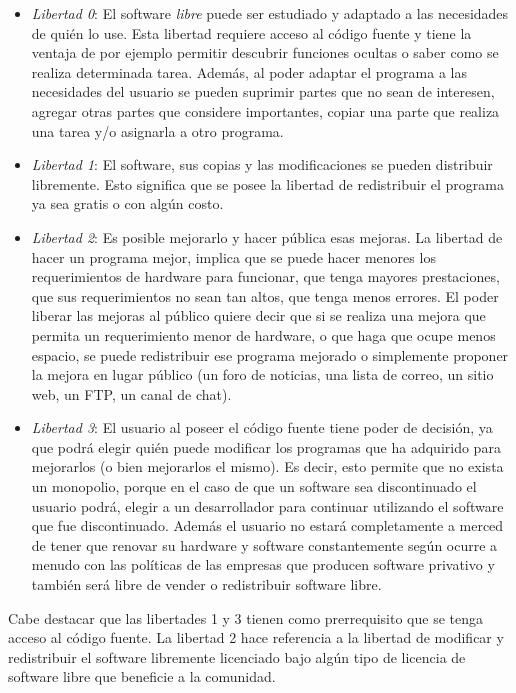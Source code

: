 \begin{itemize}
\item \textit{Libertad 0}: El software \textit{libre} puede ser
  estudiado y adaptado a las necesidades de quién lo use. Esta
  libertad requiere acceso al código fuente y tiene la ventaja de por
  ejemplo permitir descubrir funciones ocultas o saber como se realiza
  determinada tarea. Además, al poder adaptar el programa a las
  necesidades del usuario se pueden suprimir partes que no sean de
  interesen, agregar otras partes que considere importantes, copiar
  una parte que realiza una tarea y/o asignarla a otro programa.
\item \textit{Libertad 1}: El software, sus copias y las
  modificaciones se pueden distribuir libremente. Esto significa que
  se posee la libertad de redistribuir el programa ya sea gratis o con
  algún costo.
\item \textit{Libertad 2}: Es posible mejorarlo y hacer pública esas
  mejoras. La libertad de hacer un programa mejor, implica que se
  puede hacer menores los requerimientos de hardware para funcionar,
  que tenga mayores prestaciones, que sus requerimientos no sean tan
  altos, que tenga menos errores. El poder liberar las mejoras al
  público quiere decir que si se realiza una mejora que permita un
  requerimiento menor de hardware, o que haga que ocupe menos espacio,
  se puede redistribuir ese programa mejorado o simplemente proponer
  la mejora en lugar público (un foro de noticias, una lista de
  correo, un sitio web, un FTP, un canal de chat).
\item \textit{Libertad 3}: El usuario al poseer el código fuente tiene
  poder de decisión, ya que podrá elegir quién puede modificar los
  programas que ha adquirido para mejorarlos (o bien mejorarlos el
  mismo). Es decir, esto permite que no exista un monopolio, porque en
  el caso de que un software sea discontinuado el usuario podrá,
  elegir a un desarrollador para continuar utilizando el software que
  fue discontinuado. Además el usuario no estará completamente a
  merced de tener que renovar su hardware y software constantemente
  según ocurre a menudo con las políticas de las empresas que producen
  software privativo y también será libre de vender o redistribuir
  software libre.
\end{itemize}

Cabe destacar que las libertades 1 y 3 tienen como prerrequisito que
se tenga acceso al código fuente. La libertad 2 hace referencia a la
libertad de modificar y redistribuir el software libremente licenciado
bajo algún tipo de licencia de software libre que beneficie a la
comunidad.


